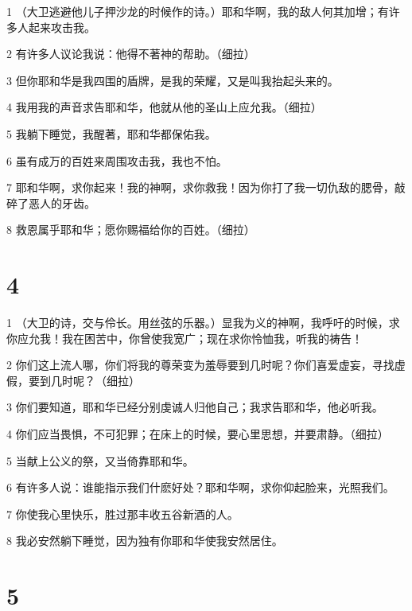 \par 1 （大卫逃避他儿子押沙龙的时候作的诗。）耶和华啊，我的敌人何其加增；有许多人起来攻击我。
\par 2 有许多人议论我说：他得不著神的帮助。（细拉）
\par 3 但你耶和华是我四围的盾牌，是我的荣耀，又是叫我抬起头来的。
\par 4 我用我的声音求告耶和华，他就从他的圣山上应允我。（细拉）
\par 5 我躺下睡觉，我醒著，耶和华都保佑我。
\par 6 虽有成万的百姓来周围攻击我，我也不怕。
\par 7 耶和华啊，求你起来！我的神啊，求你救我！因为你打了我一切仇敌的腮骨，敲碎了恶人的牙齿。
\par 8 救恩属乎耶和华；愿你赐福给你的百姓。（细拉）

\chapter{4}

\par 1 （大卫的诗，交与伶长。用丝弦的乐器。）显我为义的神啊，我呼吁的时候，求你应允我！我在困苦中，你曾使我宽广；现在求你怜恤我，听我的祷告！
\par 2 你们这上流人哪，你们将我的尊荣变为羞辱要到几时呢？你们喜爱虚妄，寻找虚假，要到几时呢？（细拉）
\par 3 你们要知道，耶和华已经分别虔诚人归他自己；我求告耶和华，他必听我。
\par 4 你们应当畏惧，不可犯罪；在床上的时候，要心里思想，并要肃静。（细拉）
\par 5 当献上公义的祭，又当倚靠耶和华。
\par 6 有许多人说：谁能指示我们什麽好处？耶和华啊，求你仰起脸来，光照我们。
\par 7 你使我心里快乐，胜过那丰收五谷新酒的人。
\par 8 我必安然躺下睡觉，因为独有你耶和华使我安然居住。

\chapter{5}

